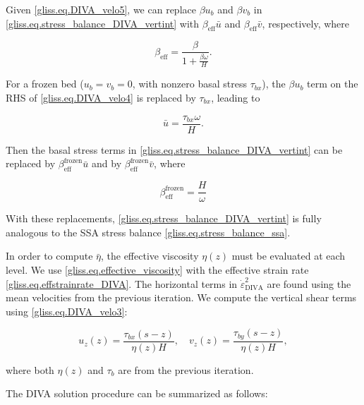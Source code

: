 {Given \eqref{gliss.eq.DIVA_velo5}, we can replace $\beta u_b$ and $\beta v_b$ in 
\eqref{gliss.eq.stress_balance_DIVA_vertint} with
$\beta_\mathrm{eff} \bar{u}$ and $\beta_\mathrm{eff} \bar{v}$, respectively, where 

\begin{equation}
  \label{gliss.eq.DIVA_effective_beta}
        {{\beta }_{\text{eff}}} = \frac{\beta }{1+\frac{\beta \omega }{H}}.
\end{equation}

\noindent
For a frozen bed ($u_b = v_b = 0$, with nonzero basal stress $\tau_{bx}$), the $\beta u_b$ term
on the RHS of \eqref{gliss.eq.DIVA_velo4} is replaced by $\tau_{bx}$, leading to

\begin{equation}
  \label{gliss.eq.DIVA_frozen_bed}
  \bar{u} = \frac{{{\tau }_{bx}}\omega }{H}.
\end{equation}

\noindent
Then the basal stress terms in \eqref{gliss.eq.stress_balance_DIVA_vertint} can be replaced
by $\beta_\text{eff}^\text{frozen} \bar{u}$ and by $\beta_\text{eff}^\text{frozen} \bar{v}$, where 

\begin{equation}
  \label{gliss.eq.DIVA_effective_beta_frozen}
        \beta_{\text{eff}}^\text{frozen} = \frac{H}{\omega}
\end{equation}

\noindent
With these replacements, \eqref{gliss.eq.stress_balance_DIVA_vertint} is fully analogous 
to the SSA stress balance \eqref{gliss.eq.stress_balance_ssa}.

In order to compute $\bar{\eta}$, the effective viscosity $\eta(z)$ must be evaluated at each level.
We use \eqref{gliss.eq.effective_viscosity} with the effective strain rate
\eqref{gliss.eq.effstrainrate_DIVA}. The horizontal terms in 
$\dot{\varepsilon }_{\text{DIVA}}^2$ are found using the mean velocities from the previous iteration.
We compute the vertical shear terms using \eqref{gliss.eq.DIVA_velo3}:

\begin{equation}
  \label{gliss.eq.DIVA_vertical_shear}
  {{u}_{z}}(z) = \frac{{{\tau }_{bx}}(s-z)}{\eta(z) H}, \quad 
  {{v}_{z}}(z) = \frac{{{\tau }_{by}}(s-z)}{\eta(z) H},
\end{equation}

\noindent
where both $\eta(z)$ and $\tau_b$ are from the previous iteration.

The DIVA solution procedure can be summarized as follows:

}
